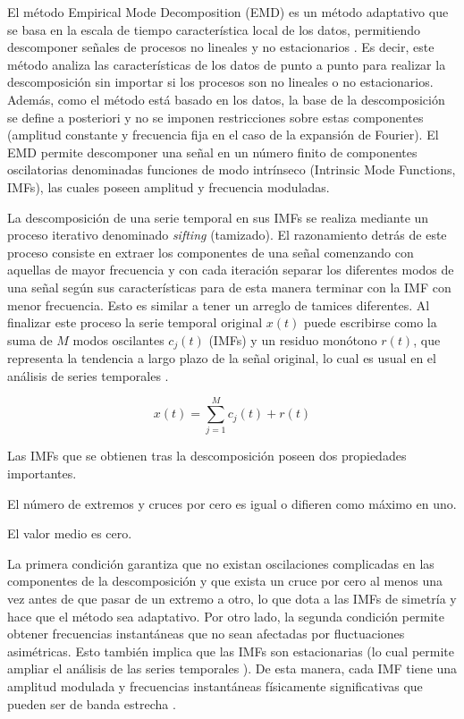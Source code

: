 El método Empirical Mode Decomposition (EMD) es un método adaptativo que se basa en la escala de tiempo característica local de los datos, permitiendo descomponer señales de procesos no lineales y no estacionarios \cite{huang_empirical_1998}. Es decir, este método analiza las características de los datos de punto a punto para realizar la descomposición sin importar si los procesos son no lineales o no estacionarios. Además, como el método está basado en los datos, la base de la descomposición se define a posteriori y no se imponen restricciones sobre estas componentes (amplitud constante y frecuencia fija en el caso de la expansión de Fourier). El EMD permite descomponer una señal en un número finito de componentes oscilatorias denominadas funciones de modo intrínseco (Intrinsic Mode Functions, IMFs), las cuales poseen amplitud y frecuencia moduladas. 

La descomposición de una serie temporal en sus IMFs se realiza mediante un proceso iterativo denominado \textit{sifting} (tamizado). El razonamiento detrás de este proceso consiste en extraer los componentes de una señal comenzando con aquellas de mayor frecuencia y con cada iteración separar los diferentes modos de una señal según sus características para de esta manera terminar con la IMF con menor frecuencia. Esto es similar a tener un arreglo de tamices diferentes. Al finalizar este proceso la serie temporal original $x(t)$ puede escribirse como la suma de $M$ modos oscilantes $c_{j}(t)$ (IMFs) y un residuo monótono $r(t)$, que representa la tendencia a largo plazo de la señal original, lo cual es usual en el análisis de series temporales \cite{chatfield_analysis_2019}. 

\begin{equation}
    x(t) = \sum_{j=1}^{M} c_{j}(t) + r(t)
    \label{emd}
\end{equation}

\newpage

Las IMFs que se obtienen tras la descomposición poseen dos propiedades importantes.

\begin{enumerate}[label=(\arabic*)]
    \hypertarget{imfs_cond1}{\item} El número de extremos y cruces por cero es igual o difieren como máximo en uno. 
    \hypertarget{imfs_cond2}{\item} El valor medio es cero. 
\end{enumerate}

La primera condición garantiza que no existan oscilaciones complicadas en las componentes de la descomposición y que exista un cruce por cero al menos una vez antes de que pasar de un extremo a otro, lo que dota a las IMFs de simetría y hace que el método sea adaptativo. Por otro lado, la segunda condición permite obtener frecuencias instantáneas que no sean afectadas por fluctuaciones asimétricas. Esto también implica que las IMFs son estacionarias (lo cual permite ampliar el análisis de las series temporales \cite{huang_amplitude-frequency_2008}). De esta manera, cada IMF tiene una amplitud modulada y frecuencias instantáneas físicamente significativas que pueden ser de banda estrecha \cite{huang_empirical_1998}.  

